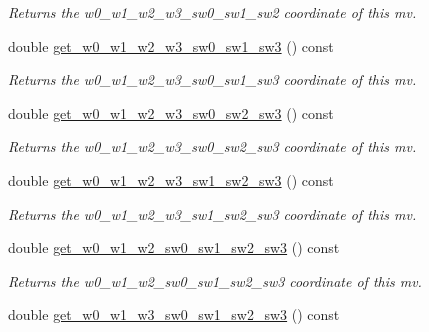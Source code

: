 \begin{DoxyCompactItemize}
\begin{DoxyCompactList}\small\item\em Returns the w0\-\_\-w1\-\_\-w2\-\_\-w3\-\_\-sw0\-\_\-sw1\-\_\-sw2 coordinate of this mv. \end{DoxyCompactList}\item 
\hypertarget{classe3ga_1_1mv_a73e0adccc64b5d19a2631b11c77bca3b}{double \hyperlink{classe3ga_1_1mv_a73e0adccc64b5d19a2631b11c77bca3b}{get\-\_\-w0\-\_\-w1\-\_\-w2\-\_\-w3\-\_\-sw0\-\_\-sw1\-\_\-sw3} () const }\label{classe3ga_1_1mv_a73e0adccc64b5d19a2631b11c77bca3b}

\begin{DoxyCompactList}\small\item\em Returns the w0\-\_\-w1\-\_\-w2\-\_\-w3\-\_\-sw0\-\_\-sw1\-\_\-sw3 coordinate of this mv. \end{DoxyCompactList}\item 
\hypertarget{classe3ga_1_1mv_a530e72ccccb2688d7e52ae14e2e1f0c8}{double \hyperlink{classe3ga_1_1mv_a530e72ccccb2688d7e52ae14e2e1f0c8}{get\-\_\-w0\-\_\-w1\-\_\-w2\-\_\-w3\-\_\-sw0\-\_\-sw2\-\_\-sw3} () const }\label{classe3ga_1_1mv_a530e72ccccb2688d7e52ae14e2e1f0c8}

\begin{DoxyCompactList}\small\item\em Returns the w0\-\_\-w1\-\_\-w2\-\_\-w3\-\_\-sw0\-\_\-sw2\-\_\-sw3 coordinate of this mv. \end{DoxyCompactList}\item 
\hypertarget{classe3ga_1_1mv_ae6c8dd54223b198e087f6b4bd77af427}{double \hyperlink{classe3ga_1_1mv_ae6c8dd54223b198e087f6b4bd77af427}{get\-\_\-w0\-\_\-w1\-\_\-w2\-\_\-w3\-\_\-sw1\-\_\-sw2\-\_\-sw3} () const }\label{classe3ga_1_1mv_ae6c8dd54223b198e087f6b4bd77af427}

\begin{DoxyCompactList}\small\item\em Returns the w0\-\_\-w1\-\_\-w2\-\_\-w3\-\_\-sw1\-\_\-sw2\-\_\-sw3 coordinate of this mv. \end{DoxyCompactList}\item 
\hypertarget{classe3ga_1_1mv_a3de363cc9d2e3fb650988920f87f1f6b}{double \hyperlink{classe3ga_1_1mv_a3de363cc9d2e3fb650988920f87f1f6b}{get\-\_\-w0\-\_\-w1\-\_\-w2\-\_\-sw0\-\_\-sw1\-\_\-sw2\-\_\-sw3} () const }\label{classe3ga_1_1mv_a3de363cc9d2e3fb650988920f87f1f6b}

\begin{DoxyCompactList}\small\item\em Returns the w0\-\_\-w1\-\_\-w2\-\_\-sw0\-\_\-sw1\-\_\-sw2\-\_\-sw3 coordinate of this mv. \end{DoxyCompactList}\item 
\hypertarget{classe3ga_1_1mv_a6281f97cde5c695666aedb93145a0468}{double \hyperlink{classe3ga_1_1mv_a6281f97cde5c695666aedb93145a0468}{get\-\_\-w0\-\_\-w1\-\_\-w3\-\_\-sw0\-\_\-sw1\-\_\-sw2\-\_\-sw3} () const }\label{classe3ga_1_1mv_a6281f97cde5c695666aedb93145a0468}


\end{DoxyCompactItemize}
